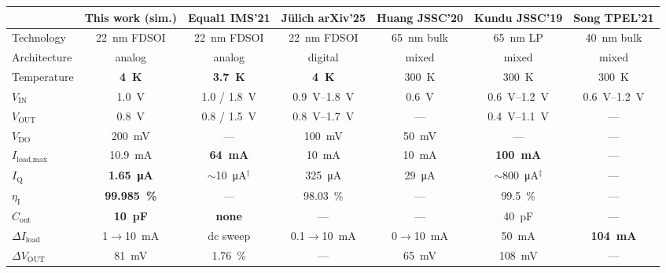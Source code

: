 \begin{table}[t]
\centering
\footnotesize
\setlength{\tabcolsep}{3pt}
\renewcommand{\arraystretch}{1.05}
\begin{tabular}{@{}l|c|c|c|c|c|c@{}}
\toprule
& \textbf{This work (sim.)} & Equal1 IMS'21 & J\"ulich arXiv'25 & Huang JSSC'20 & Kundu JSSC'19 & Song TPEL'21 \\
\midrule \hline
Technology & \SI{22}{\nano\meter} FDSOI & \SI{22}{\nano\meter} FDSOI & \SI{22}{\nano\meter} FDSOI & \SI{65}{\nano\meter} bulk & \SI{65}{\nano\meter} LP & \SI{40}{\nano\meter} bulk \\
\hline
Architecture & analog & analog & digital & mixed & mixed & mixed \\
\hline
Temperature & \textbf{\SI{4}{\kelvin}} & \textbf{\SI{3.7}{\kelvin}} & \textbf{\SI{4}{\kelvin}} & \SI{300}{\kelvin} & \SI{300}{\kelvin} & \SI{300}{\kelvin} \\
\hline
$V_\text{IN}$ & \SI{1.0}{\volt} & 1.0 / \SI{1.8}{\volt} & \SIrange{0.9}{1.8}{\volt} & \SI{0.6}{\volt} & \SIrange{0.6}{1.2}{\volt} & \SIrange{0.6}{1.2}{\volt} \\
\hline
$V_\text{OUT}$ & \SI{0.8}{\volt} & 0.8 / \SI{1.5}{\volt} & \SIrange{0.8}{1.7}{\volt} & --- & \SIrange{0.4}{1.1}{\volt} & --- \\
\hline
$V_\text{DO}$ & \SI{200}{\milli\volt} & --- & \SI{100}{\milli\volt} & \SI{50}{\milli\volt} & --- & --- \\
\hline
$I_\text{load,max}$ & \SI{10.9}{\milli\ampere} & \textbf{\SI{64}{\milli\ampere}} & \SI{10}{\milli\ampere} & \SI{10}{\milli\ampere} & \textbf{\SI{100}{\milli\ampere}} & --- \\
\hline
$I_\text{Q}$ & \textbf{\SI{1.65}{\micro\ampere}} & $\sim$\SI{10}{\micro\ampere}$^{\dagger}$ & \SI{325}{\micro\ampere} & \SI{29}{\micro\ampere} & $\sim$\SI{800}{\micro\ampere}$^{\ddagger}$ & --- \\
\hline
$\eta_\text{I}$ & \textbf{\SI{99.985}{\percent}} & --- & \SI{98.03}{\percent} & --- & \SI{99.5}{\percent} & --- \\
\hline
$C_\text{out}$ & \textbf{\SI{10}{\pico\farad}} & \textbf{none} & --- & --- & \SI{40}{\pico\farad} & --- \\
\midrule \hline
$\Delta I_\text{load}$ & \SI{1}{}$\to$\SI{10}{\milli\ampere} & dc sweep & \SI{0.1}{}$\to$\SI{10}{\milli\ampere} & \SI{0}{}$\to$\SI{10}{\milli\ampere} & \SI{50}{\milli\ampere} & \textbf{\SI{104}{\milli\ampere}} \\
\hline
$\Delta V_\text{OUT}$ & \SI{81}{\milli\volt} & \SI{1.76}{\percent} & --- & \SI{65}{\milli\volt} & \SI{108}{\milli\volt} & --- \\

\end{tabular}
\end{table}
